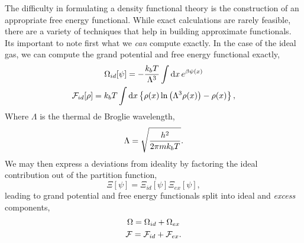 The difficulty in formulating a density functional theory is the construction
of an appropriate free energy functional.  While exact calculations are rarely
feasible, there are a variety of techniques that help in building approximate
functionals.  Its important to note first what we \textit{can} compute exactly.
In the case of the ideal gas, we can compute the grand potential and free
energy functional exactly,
%
\begin{gather}
    \Omega_{id}[\psi] = -\frac{k_bT}{\Lambda^{3}} 
        \int\mathrm{d}x\,e^{\beta\psi(x)} \\ 
    \mathcal{F}_{id}[\rho] = k_bT\int \mathrm{d}x
        \left\lbrace \rho(x) \ln\left(\Lambda^3\rho(x)\right) - \rho(x) \right\rbrace,
    \label{F_ideal}
\end{gather}
% 
Where $\Lambda$ is the thermal de Broglie wavelength,
%
\begin{equation}
    \Lambda = \sqrt{\frac{h^2}{2\pi mk_bT}}.
\end{equation}
%
We may then express a deviations from ideality by factoring the ideal
contribution out of the partition function,
%
\begin{equation}
    \Xi[\psi] = \Xi_{id}[\psi]\Xi_{ex}[\psi],
\end{equation}
%
leading to grand potential and free energy functionals split into ideal and
\textit{excess} components,
%
\begin{gather}
    \Omega = \Omega_{id} + \Omega_{ex} \\
    \mathcal{F} = \mathcal{F}_{id} + \mathcal{F}_{ex}.
\end{gather}


